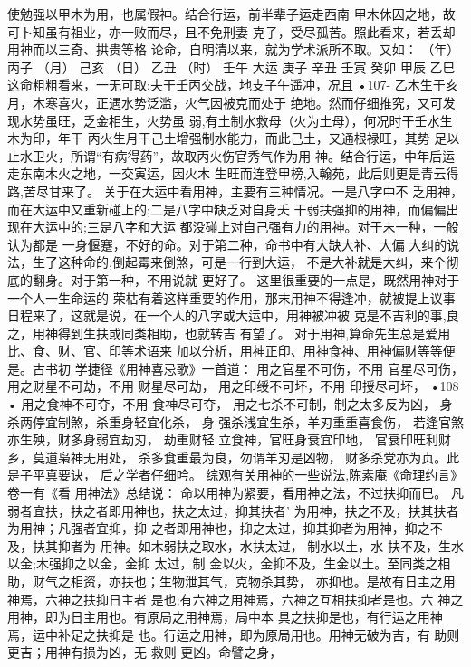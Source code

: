 使勉强以甲木为用，也属假神。结合行运，前半辈子运走西南
甲木休囚之地，故可卜知虽有祖业，亦一败而尽，且不免刑妻
克子，受尽孤苦。照此看来，若丢却用神而以三奇、拱贵等格
论命，自明清以来，就为学术派所不取。又如：
（年） 丙子
（月） 己亥
（日） 乙丑
（时） 壬午
大运 庚子
辛丑
壬寅
癸卯
甲辰
乙巳
这命粗粗看来，一无可取:夫干壬丙交战，地支子午遥冲，况且
•107-
乙木生于亥月，木寒喜火，正遇水势泛滥，火气因被克而处于
绝地。然而仔细推究，又可发现水势虽旺，乏金相生，火势虽
弱,有土制水救母（火为土母），何况时干壬水生木为印，年干
丙火生月干己土增强制水能力，而此己土，又通根禄旺，其势
足以止水卫火，所谓“有病得药”，故取丙火伤官秀气作为用
神。结合行运，中年后运走东南木火之地，一交寅运，因火木
生旺而连登甲榜,入翰苑，此后则更是青云得路,苦尽甘来了。
关于在大运中看用神，主要有三种情况。一是八字中不
乏用神，而在大运中又重新碰上的;二是八字中缺乏对自身夭
干弱扶强抑的用神，而偏偏出现在大运中的;三是八字和大运
都没碰上对自己强有力的用神。对于末一种，一般认为都是
一身偃蹇，不好的命。对于第二种，命书中有大缺大补、大偏
大纠的说法，生了这种命的,倒起霉来倒煞，可是一行到大运，
不是大补就是大纠，来个彻底的翻身。对于第一种，不用说就
更好了。
这里很重要的一点是，既然用神对于一个人一生命运的
荣枯有着这样重要的作用，那末用神不得逢冲，就被提上议事
日程来了，这就是说，在一个人的八字或大运中，用神被冲被
克是不吉利的事,良之，用神得到生扶或同类相助，也就转吉
有望了。
对于用神,算命先生总是爱用比、食、财、官、印等术语来
加以分析，用神正印、用神食神、用神偏财等等便是。古书初
学捷径《用神喜忌歌》一首道：
用之官星不可伤，不用 官星尽可伤，
用之财星不可劫，不用 财星尽可劫，
用之印绶不可坏，不用 印授尽可坏，
•108 •
用之食神不可夺，不用 食神尽可夺，
用之七杀不可制，制之太多反为凶，
身杀两停宜制煞，杀重身轻宜化杀，
身 强杀浅宜生杀，羊刃重重喜食伤，
若逢官煞亦生殃，财多身弱宜劫刃，
劫重财轻 立食神，官旺身衰宜印地，
官衰印旺利财乡，莫道枭神无用处，
杀多食重最为良，勿谓羊刃是凶物，
财多杀党亦为贞。此是子平真要诀，
后之学者仔细吟。
综观有关用神的一些说法,陈素庵《命理约言》卷一有《看
用神法》总结说：
命以用神为紧要，看用神之法，不过扶抑而巳。
凡弱者宜扶，扶之者即用神也，扶之太过，抑其扶者’
为用神，扶之不及，扶其扶者为用神；凡强者宜抑，抑
之者即用神也，抑之太过，抑其抑者为用神，抑之不
及，扶其抑者为 用神。如木弱扶之取水，水扶太过，
制水以土，水 扶不及，生水以金;木强抑之以金，金抑
太过，制 金以火，金抑不及，生金以土。至同类之相
助，财气之相资，亦扶也；生物泄其气，克物杀其势，
亦抑也。是故有日主之用神焉，六神之扶抑日主者
是也;有六神之用神焉，六神之互相扶抑者是也。六
神之用神，即为日主用也。有原局之用神焉，局中本
具之扶抑是也，有行运之用神焉，运中补足之扶抑是
也。行运之用神，即为原局用也。用神无破为吉，有
助则更吉；用神有损为凶，无 救则 更凶。命譬之身，
